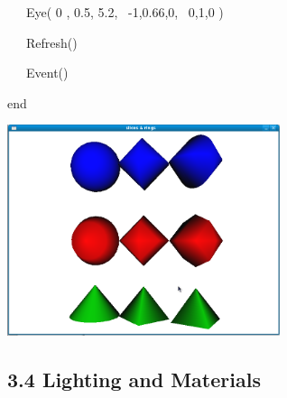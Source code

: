 \documentclass[letterpaper]{article}
\begin{document}
{\sffamily
\ \ \ Eye( 0 , 0.5, 5.2, \ {}-1,0.66,0, \ 0,1,0 )}

{\sffamily
\ \ \ Refresh()}

{\sffamily
\ \ \ Event()}

{\sffamily
end}


\bigskip



\begin{center}
\includegraphics[width=3.148in,height=2.4299in]{utr9/utr9-img022.png}
\end{center}

\subsection[3.4 Lighting and Materials]{3.4 Lighting and Materials}
\end{document}
